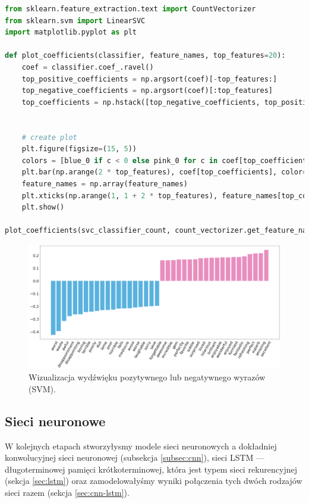\begin{lstlisting}[language=Python,frame=single, breaklines=true, caption=Wizualizacja SVM.,label=code:svc-visual]
from sklearn.feature_extraction.text import CountVectorizer
from sklearn.svm import LinearSVC
import matplotlib.pyplot as plt

def plot_coefficients(classifier, feature_names, top_features=20):
	coef = classifier.coef_.ravel()
	top_positive_coefficients = np.argsort(coef)[-top_features:]
	top_negative_coefficients = np.argsort(coef)[:top_features]
	top_coefficients = np.hstack([top_negative_coefficients, top_positive_coefficients])
	
	
	# create plot
	plt.figure(figsize=(15, 5))
	colors = [blue_0 if c < 0 else pink_0 for c in coef[top_coefficients]]
	plt.bar(np.arange(2 * top_features), coef[top_coefficients], color=colors)
	feature_names = np.array(feature_names)
	plt.xticks(np.arange(1, 1 + 2 * top_features), feature_names[top_coefficients], rotation=60, ha='right')
	plt.show()

plot_coefficients(svc_classifier_count, count_vectorizer.get_feature_names())	
\end{lstlisting}

\begin{figure}[H]
	\centering
	\includegraphics[width=1\linewidth]{images/chapter3/svc-visual.pdf}
	\caption{Wizualizacja wydźwięku pozytywnego lub negatywnego wyrazów (SVM).}
	\label{fig:visual-svc}
\end{figure}



\subsection{Sieci neuronowe}
W kolejnych etapach stworzyłysmy modele sieci neuronowych a dokładniej konwolucyjnej sieci neuronowej (subsekcja \ref{subsec:cnn}), sieci LSTM --- długoterminowej pamięci krótkoterminowej, która jest typem sieci rekurencyjnej (sekcja \ref{sec:lstm}) oraz zamodelowałyśmy wyniki połączenia tych dwóch rodzajów sieci razem (sekcja \ref{sec:cnn-lstm}).

